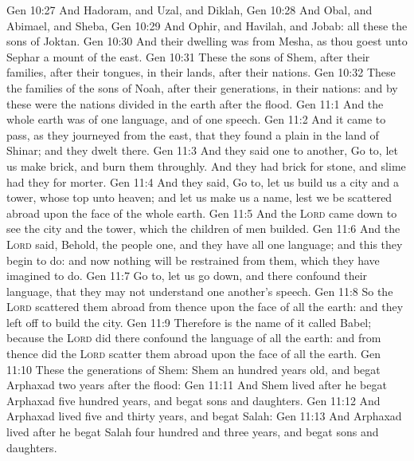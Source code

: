 \vs Gen 10:27 And Hadoram, and Uzal, and Diklah,
\vs Gen 10:28 And Obal, and Abimael, and Sheba,
\vs Gen 10:29 And Ophir, and Havilah, and Jobab: all these  the sons of Joktan.
\vs Gen 10:30 And their dwelling was from Mesha, as thou goest unto Sephar a mount of the east.
\vs Gen 10:31 These  the sons of Shem, after their families, after their tongues, in their lands, after their nations.
\vs Gen 10:32 These  the families of the sons of Noah, after their generations, in their nations: and by these were the nations divided in the earth after the flood.
\vs Gen 11:1 And the whole earth was of one language, and of one speech.
\vs Gen 11:2 And it came to pass, as they journeyed from the east, that they found a plain in the land of Shinar; and they dwelt there.
\vs Gen 11:3 And they said one to another, Go to, let us make brick, and burn them throughly. And they had brick for stone, and slime had they for morter.
\vs Gen 11:4 And they said, Go to, let us build us a city and a tower, whose top  unto heaven; and let us make us a name, lest we be scattered abroad upon the face of the whole earth.
\vs Gen 11:5 And the \textsc{Lord} came down to see the city and the tower, which the children of men builded.
\vs Gen 11:6 And the \textsc{Lord} said, Behold, the people  one, and they have all one language; and this they begin to do: and now nothing will be restrained from them, which they have imagined to do.
\vs Gen 11:7 Go to, let us go down, and there confound their language, that they may not understand one another's speech.
\vs Gen 11:8 So the \textsc{Lord} scattered them abroad from thence upon the face of all the earth: and they left off to build the city.
\vs Gen 11:9 Therefore is the name of it called Babel; because the \textsc{Lord} did there confound the language of all the earth: and from thence did the \textsc{Lord} scatter them abroad upon the face of all the earth.
\vs Gen 11:10 These  the generations of Shem: Shem  an hundred years old, and begat Arphaxad two years after the flood:
\vs Gen 11:11 And Shem lived after he begat Arphaxad five hundred years, and begat sons and daughters.
\vs Gen 11:12 And Arphaxad lived five and thirty years, and begat Salah:
\vs Gen 11:13 And Arphaxad lived after he begat Salah four hundred and three years, and begat sons and daughters.
